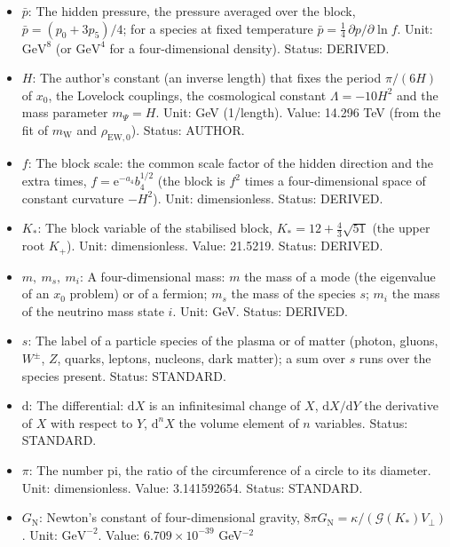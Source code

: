 \documentclass[
  10pt,
]{article}
\begin{document}
\begin{itemize}
  block response. Unit: dimensionless. Value: -0.140028. Status:
  DERIVED.
\item
  \(\bar p\): The hidden pressure, the pressure averaged over the block,
  \(\bar p = (p_0 + 3p_5)/4\); for a species at fixed temperature
  \(\bar p = \frac14\,\partial p/\partial\ln f\). Unit:
  \(\mathrm{GeV}^{8}\) (or \(\mathrm{GeV}^{4}\) for a four-dimensional
  density). Status: DERIVED.
\item
  \(H\): The author's constant (an inverse length) that fixes the period
  \(\pi/(6H)\) of \(x_0\), the Lovelock couplings, the cosmological
  constant \(\Lambda = -10H^2\) and the mass parameter \(m_\Psi = H\).
  Unit: GeV (1/length). Value: 14.296 TeV (from the fit of
  \(m_{\mathrm{W}}\) and \(\rho_{\mathrm{EW},0}\)). Status: AUTHOR.
\item
  \(f\): The block scale: the common scale factor of the hidden
  direction and the extra times, \(f = \mathrm{e}^{-a_4}b_4^{1/2}\) (the
  block is \(f^2\) times a four-dimensional space of constant curvature
  \(-H^2\)). Unit: dimensionless. Status: DERIVED.
\item
  \(K_*\): The block variable of the stabilised block,
  \(K_* = 12 + \frac43\sqrt{51}\) (the upper root \(K_+\)). Unit:
  dimensionless. Value: 21.5219. Status: DERIVED.
\item
  \(m,\ m_s,\ m_i\): A four-dimensional mass: \(m\) the mass of a mode
  (the eigenvalue of an \(x_0\) problem) or of a fermion; \(m_s\) the
  mass of the species \(s\); \(m_i\) the mass of the neutrino mass state
  \(i\). Unit: GeV. Status: DERIVED.
\item
  \(s\): The label of a particle species of the plasma or of matter
  (photon, gluons, \(W^\pm\), \(Z\), quarks, leptons, nucleons, dark
  matter); a sum over \(s\) runs over the species present. Status:
  STANDARD.
\item
  \(\mathrm{d}\): The differential: \(\mathrm{d}X\) is an infinitesimal
  change of \(X\), \(\mathrm{d}X/\mathrm{d}Y\) the derivative of \(X\)
  with respect to \(Y\), \(\mathrm{d}^nX\) the volume element of \(n\)
  variables. Status: STANDARD.
\item
  \(\pi\): The number pi, the ratio of the circumference of a circle to
  its diameter. Unit: dimensionless. Value: 3.141592654. Status:
  STANDARD.
\item
  \(G_{\mathrm{N}}\): Newton's constant of four-dimensional gravity,
  \(8\pi G_{\mathrm{N}} = \kappa/(\mathcal{G}(K_*)V_\perp)\). Unit:
  \(\mathrm{GeV}^{-2}\). Value: \(6.709\times10^{-39}\) GeV\(^{-2}\)

\end{itemize}
\end{document}
